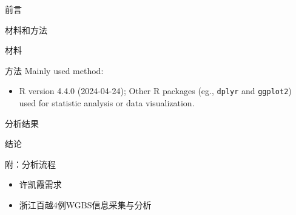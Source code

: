 \documentclass[
  ignorenonframetext,
]{beamer}
\providecommand{\tightlist}{%
  \setlength{\itemsep}{0pt}\setlength{\parskip}{0pt}}
\begin{document}
\begin{frame}{前言}
\protect\hypertarget{introduction}{}
\end{frame}

\begin{frame}[fragile]{材料和方法}
\protect\hypertarget{methods}{}
\begin{block}{材料}
\protect\hypertarget{ux6750ux6599}{}
\end{block}

\begin{block}{方法}
\protect\hypertarget{ux65b9ux6cd5}{}
Mainly used method:

\begin{itemize}
\tightlist
\item
  R version 4.4.0 (2024-04-24); Other R packages (eg., \texttt{dplyr}
  and \texttt{ggplot2}) used for statistic analysis or data
  visualization.
\end{itemize}
\end{block}
\end{frame}

\begin{frame}{分析结果}
\protect\hypertarget{results}{}
\end{frame}

\begin{frame}{结论}
\protect\hypertarget{dis}{}
\end{frame}

\begin{frame}{附：分析流程}
\protect\hypertarget{workflow}{}
\begin{itemize}
\tightlist
\item
  许凯霞需求
\item
  浙江百越4例WGBS信息采集与分析
\end{itemize}
\end{frame}
\end{document}
